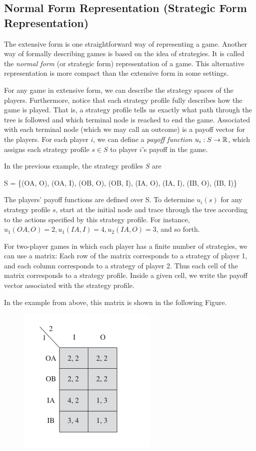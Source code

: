 \subsection{Normal Form Representation (Strategic Form Representation)}

The extensive form is one straightforward way of representing a game. Another way of formally describing games is based on the idea of strategies. It is called the \emph{normal form} (or strategic form) representation of a game. This alternative representation is more compact than the extensive form in some settings.

For any game in extensive form, we can describe the strategy spaces of the players. Furthermore, notice that each strategy profile fully describes how the game is played. That is, a strategy profile tells us exactly what path through the tree is followed and which terminal node is reached to end the game. Associated with each terminal node (which we may call an outcome) is a payoff vector for the players. For each player $i$, we can define a \emph{payoff function} $u_i: S \rightarrow \mathbb{R}$, which assigns each strategy profile $s \in S$ to player $i$'s payoff in the game. 

In the previous example, the strategy profiles $S$ are

\bee
S = \{(OA, O),  (OA, I), (OB, O), (OB, I), (IA, O), (IA, I), (IB, O), (IB, I)\}
\eee

The players’ payoff functions are defined over S. To determine $u_i(s)$ for any strategy profile $s$, start at the initial node and trace through the tree
according to the actions specified by this strategy profile. For instance, $u_1(OA, O) = 2, u_1(IA, I) = 4, u_2(IA, O) = 3$, and so forth.

For two-player games in which each player has a finite number of strategies, we can use a matrix: Each row of the matrix corresponds to a strategy of player 1, and each column corresponds to a strategy of player 2. Thus each cell of the matrix corresponds to a strategy profile. Inside a given cell, we write the payoff vector associated with the strategy profile.

In the example from above, this matrix is shown in the following Figure.


\begin{figure}[H]
    \centering
    \includegraphics[scale=0.7]{images/2023-10-10-game_theory_03a.png}
\end{figure}


